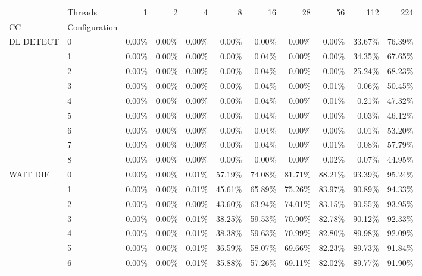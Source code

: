 \begin{tabular}{llrrrrrrrrr}
\toprule
       & Threads &   1   &   2   &   4   &    8   &    16  &    28  &    56  &    112 &    224 \\
CC & Configuration &       &       &       &        &        &        &        &        &        \\
\midrule
DL DETECT & 0 & 0.00\% & 0.00\% & 0.00\% &  0.00\% &  0.00\% &  0.00\% &  0.00\% & 33.67\% & 76.39\% \\
       & 1 & 0.00\% & 0.00\% & 0.00\% &  0.00\% &  0.04\% &  0.00\% &  0.00\% & 34.35\% & 67.65\% \\
       & 2 & 0.00\% & 0.00\% & 0.00\% &  0.00\% &  0.04\% &  0.00\% &  0.00\% & 25.24\% & 68.23\% \\
       & 3 & 0.00\% & 0.00\% & 0.00\% &  0.00\% &  0.04\% &  0.00\% &  0.01\% &  0.06\% & 50.45\% \\
       & 4 & 0.00\% & 0.00\% & 0.00\% &  0.00\% &  0.04\% &  0.00\% &  0.01\% &  0.21\% & 47.32\% \\
       & 5 & 0.00\% & 0.00\% & 0.00\% &  0.00\% &  0.04\% &  0.00\% &  0.00\% &  0.03\% & 46.12\% \\
       & 6 & 0.00\% & 0.00\% & 0.00\% &  0.00\% &  0.04\% &  0.00\% &  0.00\% &  0.01\% & 53.20\% \\
       & 7 & 0.00\% & 0.00\% & 0.00\% &  0.00\% &  0.04\% &  0.00\% &  0.01\% &  0.08\% & 57.79\% \\
       & 8 & 0.00\% & 0.00\% & 0.00\% &  0.00\% &  0.00\% &  0.00\% &  0.02\% &  0.07\% & 44.95\% \\
WAIT DIE & 0 & 0.00\% & 0.00\% & 0.01\% & 57.19\% & 74.08\% & 81.71\% & 88.21\% & 93.39\% & 95.24\% \\
       & 1 & 0.00\% & 0.00\% & 0.01\% & 45.61\% & 65.89\% & 75.26\% & 83.97\% & 90.89\% & 94.33\% \\
       & 2 & 0.00\% & 0.00\% & 0.00\% & 43.60\% & 63.94\% & 74.01\% & 83.15\% & 90.55\% & 93.95\% \\
       & 3 & 0.00\% & 0.00\% & 0.01\% & 38.25\% & 59.53\% & 70.90\% & 82.78\% & 90.12\% & 92.33\% \\
       & 4 & 0.00\% & 0.00\% & 0.01\% & 38.38\% & 59.63\% & 70.99\% & 82.80\% & 89.98\% & 92.09\% \\
       & 5 & 0.00\% & 0.00\% & 0.01\% & 36.59\% & 58.07\% & 69.66\% & 82.23\% & 89.73\% & 91.84\% \\
       & 6 & 0.00\% & 0.00\% & 0.01\% & 35.88\% & 57.26\% & 69.11\% & 82.02\% & 89.77\% & 91.90\% \\

\end{tabular}
